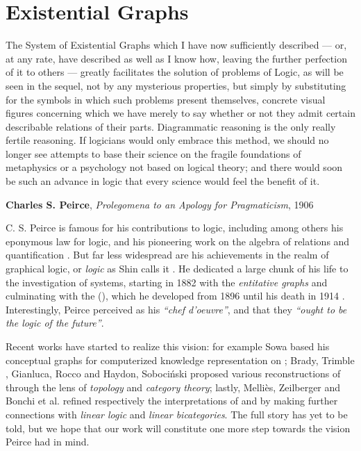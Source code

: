 \setchapterpreamble[u]{\margintoc}
\chapter{Existential Graphs}

\epigraph{The System of Existential Graphs which I have now sufficiently
described --- or, at any rate, have described as well as I know how, leaving the
further perfection of it to others --- greatly facilitates the solution of
problems of Logic, as will be seen in the sequel, not by any mysterious
properties, but simply by substituting for the symbols in which such problems
present themselves, concrete visual figures concerning which we have merely to
say whether or not they admit certain describable relations of their parts.
Diagrammatic reasoning is the only really fertile reasoning. If logicians would
only embrace this method, we should no longer see attempts to base their science
on the fragile foundations of metaphysics or a psychology not based on logical
theory; and there would soon be such an advance in logic that every science
would feel the benefit of it.}{\textbf{Charles S. Peirce}, \textit{Prolegomena
to an Apology for Pragmaticism}, 1906}


C. S. Peirce is famous for his contributions to  logic, including among
others his eponymous law for  logic, and his pioneering work on the
algebra of relations and quantification . But far
less widespread are his achievements in the realm of graphical logic, or
\emph{ logic} as Shin calls it .
He dedicated a large chunk of his life to the investigation of 
systems, starting in 1882 with the \emph{entitative graphs} and culminating with
the  (), which he developed from 1896 until his
death in 1914 . Interestingly, Peirce perceived
 as his \textit{``chef d'oeuvre''}, and that they
\textit{``ought to be the logic of the future''}.

Recent works have started to realize this vision: for example Sowa based his
conceptual graphs for computerized knowledge representation on 
; Brady, Trimble
, Gianluca, Rocco
 and Haydon, Sobociński
 proposed various reconstructions of
 through the lens of \emph{topology} and \emph{category theory}; lastly,
Melliès, Zeilberger  and Bonchi et al.
 refined respectively the interpretations of
\cite{brady_string_nodate} and \cite{pietarinen_compositional_2020} by making
further connections with \emph{linear logic}  and
\emph{linear bicategories}. The full story has yet to be told, but we hope that
our work will constitute one more step towards the vision Peirce had in mind.

